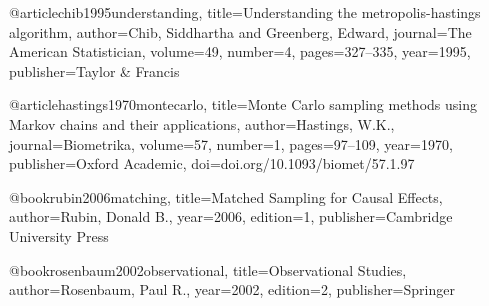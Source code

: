 @article{chib1995understanding,
  title={Understanding the metropolis-hastings algorithm},
  author={Chib, Siddhartha and Greenberg, Edward},
  journal={The American Statistician},
  volume={49},
  number={4},
  pages={327--335},
  year={1995},
  publisher={Taylor \& Francis}
}





@article{hastings1970montecarlo,
  title={Monte Carlo sampling methods using Markov chains and their applications},
  author={Hastings, W.K.},
  journal={Biometrika},
  volume={57},
  number={1},
  pages={97--109},
  year={1970},
  publisher={Oxford Academic},
  doi={doi.org/10.1093/biomet/57.1.97}
}







































































@book{rubin2006matching,
 title={Matched Sampling for Causal Effects},
 author={Rubin, Donald B.},
 year={2006},
 edition={1},
 publisher={Cambridge University Press}
}





@book{rosenbaum2002observational,
 title={Observational Studies},
 author={Rosenbaum, Paul R.},
 year={2002},
 edition={2},
 publisher={Springer}
}


